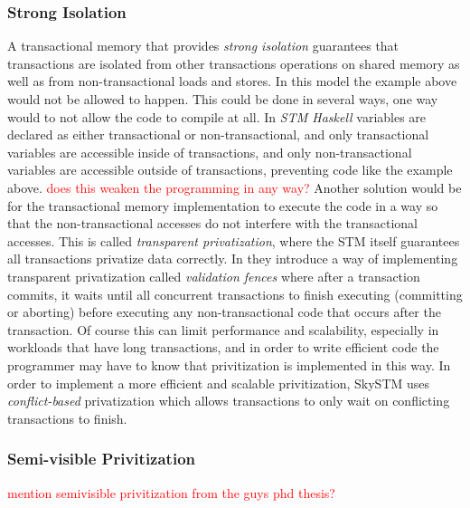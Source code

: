 \subsubsection{Strong Isolation}
A transactional memory that provides \emph{strong isolation} guarantees that transactions are isolated from other transactions operations on shared memory as well as from non-transactional loads and stores.
In this model the example above would not be allowed to happen.  This could be done in several ways, one way would to not allow the code to compile at all.  In \emph{STM Haskell} \cite{sjbc000} variables are declared as either transactional or non-transactional, and only transactional variables are accessible inside of transactions, and only non-transactional variables are accessible outside of transactions, preventing code like the example above.
\textcolor{Red}{does this weaken the programming in any way?}
Another solution would be for the transactional memory implementation to execute the code in a way so that the non-transactional accesses do not interfere with the transactional accesses.
This is called \emph{transparent privatization}, where the STM itself guarantees all transactions privatize data correctly.
In \cite{spear:privitization:podc:2007} they introduce a way of implementing transparent privatization called \emph{validation fences} where after a transaction commits, it waits until all concurrent transactions to finish executing (committing or aborting) before executing any non-transactional code that occurs after the transaction.  Of course this can limit performance and scalability, especially in workloads that have long transactions, and in order to write efficient code the programmer may have to know that privitization is implemented in this way.
In order to implement a more efficient and scalable privitization, SkySTM \cite{lev:anatomy:transact:2009} uses \emph{conflict-based} privatization which allows transactions to only wait on conflicting transactions to finish.

\subsubsection{Semi-visible Privitization}
\textcolor{Red}{mention semivisible privitization from the guys phd thesis?}

